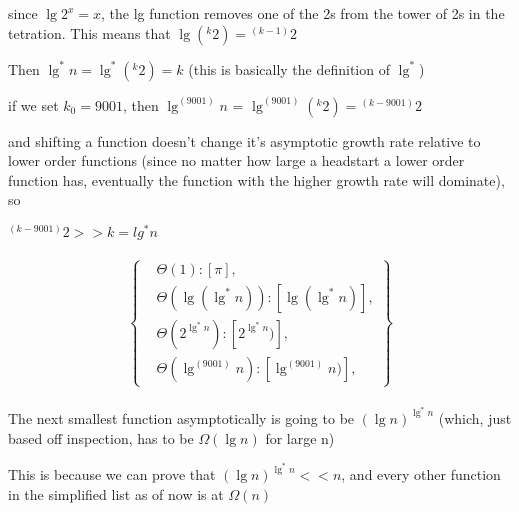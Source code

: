 \documentclass[11pt,fleqn]{article}
\theoremstyle{definition}
\theoremstyle{remark}
\begin{document}
since $\lg2^x = x$, the lg function removes one of the 2s from
the tower of 2s in the tetration. This means that $\lg{({}^k 2)} = {}^{(k-1)} 2$

Then $\lg^*n = \lg^*{({}^k 2)} = k$ (this is basically the definition of $\lg^*$)

if we set $k_0 = 9001$, then $\lg^{(9001)} n$ = $\lg^{(9001)} ({}^k 2) = {}^{(k-9001)} 2$

and shifting a function doesn't change it's asymptotic growth rate relative
to lower order functions (since no matter how large a headstart a lower order
function has, eventually the function with the higher growth rate will dominate), so

${}^{(k - 9001)} 2 >> k =lg^*n$\\\\

\[
\left\{
\begin{aligned}
& \Theta(1): [\pi],\\
& \Theta(\lg(\lg^*n)): [\lg(\lg^*n)],\\
& \Theta(2^{\lg^*n}): [2^{\lg^*n})],\\
& \Theta(\lg^{(9001)} n): [\lg^{(9001)} n)],
\end{aligned}
\right\}
\]\\


The next smallest function asymptotically is going to be
${(\lg n)}^{\lg^*{n}}$ (which, just based off inspection, has to be $\Omega(\lg n)$ for large n)

This is because we can prove that ${(\lg n)}^{\lg^*{n}} << n$, and
every other function in the simplified list as of now is at $\Omega(n)$
\end{document}

